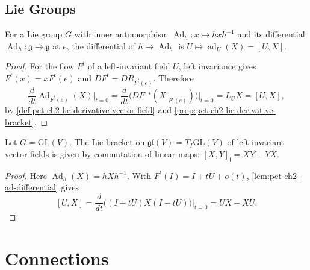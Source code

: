 \subsection{Lie Groups}

\begin{lemma}
  \label{lem:pet-ch2-ad-differential}


  For a Lie group $G$ with inner automorphism $\operatorname{Ad}_h:x\mapsto hxh^{-1}$
  and its differential $\operatorname{Ad}_h:\mathfrak g\to\mathfrak g$ at $e$, the
  differential of $h\mapsto\operatorname{Ad}_h$ is $U\mapsto\operatorname{ad}_U(X)=[U,X]$.
\end{lemma}
\begin{proof}

  \sketch
  For the flow $F^t$ of a left-invariant
  field $U$, left invariance gives $F^t(x)=xF^t(e)$ and
  $DF^t=DR_{F^t(e)}$. Therefore
  \[
    \frac d{dt}\operatorname{Ad}_{F^t(e)}(X)\Big|_{t=0}
      =\frac d{dt}\big(DF^{-t}(X|_{F^t(e)})\big)\Big|_{t=0}
      =L_UX=[U,X],
  \]
  by \cref{def:pet-ch2-lie-derivative-vector-field} and
  \cref{prop:pet-ch2-lie-derivative-bracket}.
\end{proof}

\begin{lemma}
  \label{lem:pet-ch2-gl-bracket-commutator}


  Let $G=\mathrm{GL}(V)$. The Lie bracket on $\mathfrak{gl}(V)=T_I\mathrm{GL}(V)$
  of left-invariant vector fields is given by commutation of linear maps:
  $[X,Y]_{\mathfrak l}=XY-YX$.
\end{lemma}
\begin{proof}

  \sketch
  Here
  $\operatorname{Ad}_h(X)=hXh^{-1}$. With
  $F^t(I)=I+tU+o(t)$, \cref{lem:pet-ch2-ad-differential} gives
  \[
    [U,X]
      =\frac d{dt}\big((I+tU)X(I-tU)\big)\Big|_{t=0}
      =UX-XU.
  \]
\end{proof}

\section{Connections}

